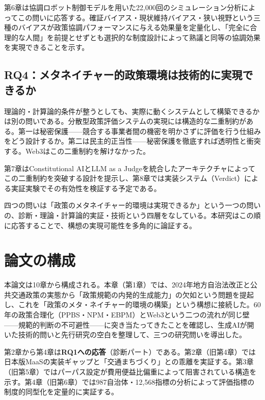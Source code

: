 第6章は協調ロボット制御モデルを用いた22,000回のシミュレーション分析によってこの問いに応答する。確証バイアス・現状維持バイアス・狭い視野という三種のバイアスが政策協調パフォーマンスに与える効果量を定量化し、「完全に合理的な人間」を前提とせずとも選択的な制度設計によって熟議と同等の協調効果を実現できることを示す。

\subsection{RQ4：メタネイチャー的政策環境は技術的に実現できるか}
\label{subsec:rq4}

理論的・計算論的条件が整うとしても、実際に動くシステムとして構築できるかは別の問いである。分散型政策評価システムの実現には構造的な二重制約がある。第一は秘密保護——競合する事業者間の機密を明かさずに評価を行う仕組みをどう設計するか。第二は民主的正当性——秘密保護を徹底すれば透明性と衝突する。Web3はこの二重制約を解けなかった。

第7章はConstitutional AIとLLM as a Judgeを統合したアーキテクチャによってこの二重制約を突破する設計を提示し、第8章では実装システム（Verdict）による実証実験でその有効性を検証する予定である。

四つの問いは「政策のメタネイチャー的環境は実現できるか」という一つの問いの、診断・理論・計算論的実証・技術という四層をなしている。本研究はこの順に応答することで、構想の実現可能性を多角的に論証する。

\section{論文の構成}
\label{sec:intro_structure}

本論文は10章から構成される。本章（第1章）では、2024年地方自治法改正と公共交通政策の実態から「政策規範の内発的生成能力」の欠如という問題を提起し、これを「政策のメタ・ネイチャー的環境の構築」という構想に接続した。60年の政策合理化（PPBS・NPM・EBPM）とWeb3という二つの流れが同じ壁——規範的判断の不可避性——に突き当たってきたことを確認し、生成AIが開いた技術的問いと先行研究の空白を整理して、三つの研究問いを導出した。

第2章から第4章は\textbf{RQ1への応答}（診断パート）である。第2章（旧第4章）では日本版MaaSの実装ギャップと「交通まちづくり」との乖離を実証する。第3章（旧第5章）ではパーパス設定が費用便益比偏重によって阻害されている構造を示す。第4章（旧第6章）では987自治体・12,568指標の分析によって評価指標の制度的同型化を定量的に実証する。

